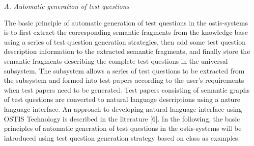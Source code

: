 \documentclass{article}
\begin{document}
\begin{multicols}{2}
\noindent\textit{A. Automatic generation of test questions}

The basic principle of automatic generation of test questions in the ostis-systems is to first extract the corresponding semantic fragments from the knowledge base using a series of test question generation strategies, then add some test question description information to the extracted semantic fragments, and finally store the semantic fragments describing the complete test questions in the universal subsystem. The subsystem allows a series of test questions to be extracted from the subsystem and formed into test papers according to the user’s requirements when test papers need to be generated. Test papers consisting of semantic graphs of test questions are converted to natural language descriptions using a nature language interface. An approach to developing natural language interface using OSTIS Technology is described in the literature [6]. In the following, the basic principles of automatic generation of test questions in the ostis-systems will be introduced using test question generation strategy based on class as examples.

\end{multicols}
\end{document}
